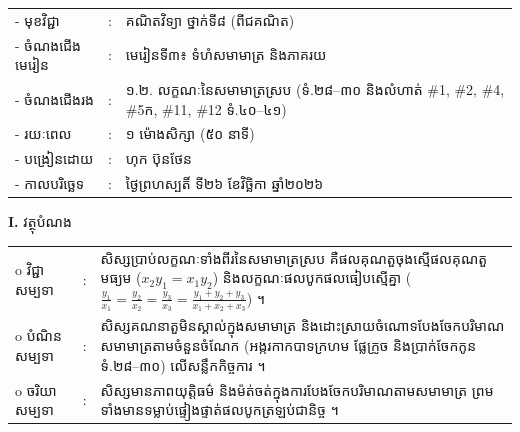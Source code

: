 \documentclass[a4paper,10pt]{article}
\newcommand{\wcirc}{{\CourierBullet\fontsize{9.5pt}{11pt}\selectfont o}}
\begin{document}
{\renewcommand{\arraystretch}{0.98}
\hspace*{3.1cm}%
\begin{tabular}{@{}l l L{11.0cm}@{}}
  - \hspace{0.35cm} មុខវិជ្ជា & : & គណិតវិទ្យា ថ្នាក់ទី៨ (ពីជគណិត) \\
  - \hspace{0.35cm} ចំណងជើងមេរៀន & : & មេរៀនទី៣៖ ទំហំសមាមាត្រ និងភាគរយ \\
  - \hspace{0.35cm} ចំណងជើងរង & : & ១.២. លក្ខណៈនៃសមាមាត្រស្រប (ទំ.២៨–៣០ និងលំហាត់ \#1, \#2, \#4, \#5ក, \#11, \#12 ទំ.៤០–៤១) \\
  - \hspace{0.35cm} រយៈពេល & : & ១ ម៉ោងសិក្សា (៥០ នាទី) \\
  - \hspace{0.35cm} បង្រៀនដោយ & : & ហុក ប៊ុនថែន \\
  - \hspace{0.35cm} កាលបរិច្ឆេទ & : & ថ្ងៃព្រហស្បតិ៍ ទី២៦ ខែវិច្ឆិកា ឆ្នាំ២០២៦ \\
\end{tabular}

\vspace{2pt}

\textbf{I.} {\muol វត្ថុបំណង}\\[1pt]
\hspace*{0.55cm}%
\begin{tabular}{@{}l l L{14.2cm}@{}}
  \wcirc \hspace{0.25cm} វិជ្ជាសម្បទា & : & សិស្សប្រាប់លក្ខណៈទាំងពីរនៃសមាមាត្រស្រប គឺផលគុណតួចុងស្មើផលគុណតួមធ្យម ($x_2 y_1 = x_1 y_2$) និងលក្ខណៈផលបូកផលធៀបស្មើគ្នា ($\frac{y_1}{x_1}=\frac{y_2}{x_2}=\frac{y_3}{x_3}=\frac{y_1+y_2+y_3}{x_1+x_2+x_3}$) ។ \\
  \wcirc \hspace{0.25cm} បំណិនសម្បទា & : & សិស្សគណនាតួមិនស្គាល់ក្នុងសមាមាត្រ និងដោះស្រាយចំណោទបែងចែកបរិមាណសមាមាត្រតាមចំនួនចំណែក (អង្ករកាកបាទក្រហម ផ្លែក្រូច និងប្រាក់ចែកកូន ទំ.២៨–៣០) លើសន្លឹកកិច្ចការ ។ \\
  \wcirc \hspace{0.25cm} ចរិយាសម្បទា & : & សិស្សមានភាពយុត្តិធម៌ និងម៉ត់ចត់ក្នុងការបែងចែកបរិមាណតាមសមាមាត្រ ព្រមទាំងមានទម្លាប់ផ្ទៀងផ្ទាត់ផលបូកត្រឡប់ជានិច្ច ។ \\
\end{tabular}

\vspace{2pt}

}
\end{document}
